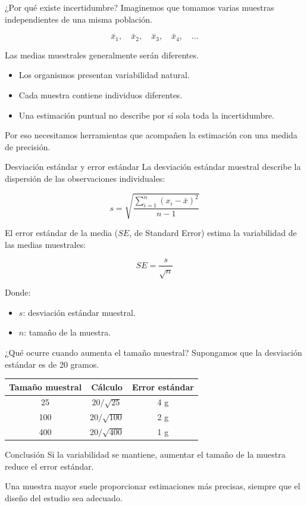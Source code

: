 \documentclass[aspectratio=169,11pt]{beamer}
\begin{document}
\begin{frame}{¿Por qué existe incertidumbre?}
Imaginemos que tomamos varias muestras independientes
de una misma población.

\[
\bar{x}_1,\quad \bar{x}_2,\quad \bar{x}_3,\quad
\bar{x}_4,\quad \ldots
\]

Las medias muestrales generalmente serán diferentes.

\begin{itemize}
    \item Los organismos presentan variabilidad natural.
    \item Cada muestra contiene individuos diferentes.
    \item Una estimación puntual no describe por sí sola
    toda la incertidumbre.
\end{itemize}

Por eso necesitamos herramientas que acompañen la
estimación con una medida de precisión.
\end{frame}

\begin{frame}{Desviación estándar y error estándar}
La desviación estándar muestral describe la dispersión
de las observaciones individuales:

\[
s=\sqrt{\frac{\sum_{i=1}^{n}(x_i-\bar{x})^2}{n-1}}
\]

El error estándar de la media ($ SE $, de Standard Error) estima la
variabilidad de las medias muestrales:

\[
SE=\frac{s}{\sqrt{n}}
\]

Donde:
\begin{itemize}
    \item $s$: desviación estándar muestral.
    \item $n$: tamaño de la muestra.
\end{itemize}
\end{frame}

\begin{frame}{¿Qué ocurre cuando aumenta el tamaño muestral?}
Supongamos que la desviación estándar es de 20 gramos.

\begin{center}
\begin{tabular}{ccc}
\toprule
Tamaño muestral & Cálculo & Error estándar\\
\midrule
25 & $20/\sqrt{25}$ & 4 g\\
100 & $20/\sqrt{100}$ & 2 g\\
400 & $20/\sqrt{400}$ & 1 g\\
\bottomrule
\end{tabular}
\end{center}

\begin{block}{Conclusión}
Si la variabilidad se mantiene, aumentar el tamaño
de la muestra reduce el error estándar.
\end{block}

Una muestra mayor suele proporcionar estimaciones
más precisas, siempre que el diseño del estudio sea adecuado.
\end{frame}
\end{document}
